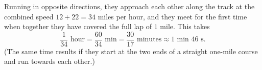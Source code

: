 Running in opposite directions, they approach each other along the track at the combined speed $12+22=34$ miles per hour, and they meet for the first time when together they have covered the full lap of $1$ mile. This takes
\[
\dfrac{1}{34}\text{ hour}=\dfrac{60}{34}\text{ min}=\boxed{\dfrac{30}{17}\text{ minutes}}\approx1\text{ min }46\text{ s}.
\]
(The same time results if they start at the two ends of a straight one-mile course and run towards each other.)
